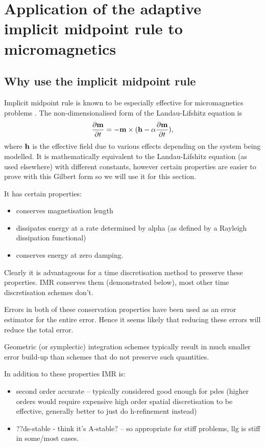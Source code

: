 \section{Application of the adaptive implicit midpoint rule to micromagnetics}


\subsection{Why use the implicit midpoint rule}

Implicit midpoint rule is known to be especially effective for micromagnetics problems \cite{DAquino2005}.
The non-dimensionalised form of the Landau-Lifshitz equation is
\begin{equation}
  \label{eq:llg-prop-form}
  \frac{\partial \mathbf{m}}{\partial t} = - \mathbf{m} \times( \mathbf{h} - \alpha \frac{\partial \mathbf{m}}{\partial t}),
\end{equation}
where $\mathbf{h}$ is the effective field due to various effects depending on the system being modelled.
It is mathematically equivalent to the Landau-Lifshitz equation (as used elsewhere) with different constants, however certain properties are easier to prove with this Gilbert form so we will use it for this section.

It has certain properties:
\begin{itemize}
\item conserves magnetisation length
\item dissipates energy at a rate determined by alpha (as defined by a Rayleigh dissipation functional)
\item conserves energy at zero damping.
\end{itemize}

Clearly it is advantageous for a time discretisation method to preserve these properties.
IMR conserves them (demonstrated below), most other time discretisation schemes don't.

Errors in both of these conservation properties have been used as an error estimator for the entire error.
Hence it seems likely that reducing these errors will reduce the total error.

Geometric (or symplectic) integration schemes typically result in much smaller error build-up than schemes that do not preserve such quantities.


In addition to these properties IMR is:
\begin{itemize}
\item second order accurate -- typically considered good enough for pdes (higher orders would require expensive high order spatial discretisation to be effective, generally better to just do h-refinement instead) \cite{Matthias}
\item ??ds-stable - think it's A-stable? \cite{??ds} -- so appropriate for stiff problems, llg is stiff in some/most cases\cite{??ds}.
\end{itemize}

